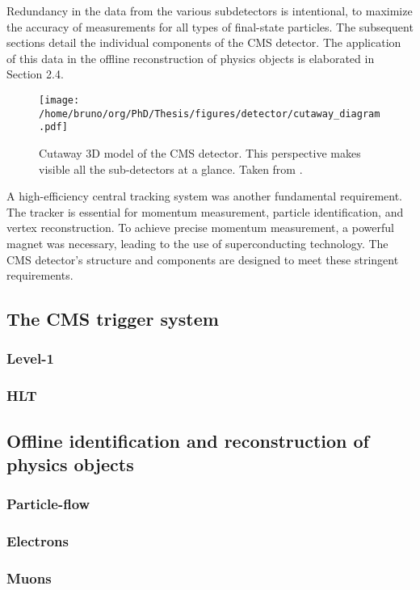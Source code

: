 \documentclass[11pt]{article}
\begin{document}
Redundancy in the data from the various subdetectors is intentional, to maximize the accuracy of measurements for all types of final-state particles.
The subsequent sections detail the individual components of the CMS detector.
The application of this data in the offline reconstruction of physics objects is elaborated in Section 2.4.

\begin{figure}
\texttt{[image: /home/bruno/org/PhD/Thesis/figures/detector/cutaway\_diagram.pdf]}
\caption{\label{fig:ggtt_results}Cutaway 3D model of the CMS detector. This perspective makes visible all the sub-detectors at a glance. Taken from \cite{cms_cutaway_diagrams}.}
\end{figure}

A high-efficiency central tracking system was another fundamental requirement.
The tracker is essential for momentum measurement, particle identification, and vertex reconstruction.
To achieve precise momentum measurement, a powerful magnet was necessary, leading to the use of superconducting technology.
The CMS detector's structure and components are designed to meet these stringent requirements.
\subsection{The CMS trigger system}
\label{sec:orgf23b528}
\subsubsection{Level-1}
\label{sec:org9f10f9a}
\subsubsection{HLT}
\label{sec:org05660d8}

\subsection{Offline identification and reconstruction of physics objects}
\label{sec:org65fd0c9}
\subsubsection{Particle-flow}
\label{sec:org024f385}
\subsubsection{Electrons}
\label{sec:orgf6012a8}
\subsubsection{Muons}
\label{sec:org190590a}
\end{document}
